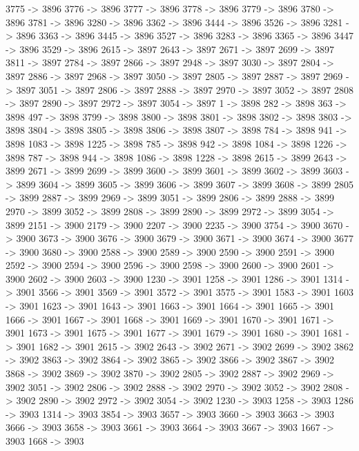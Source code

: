 {	3775 -> 3896
	3776 -> 3896
	3777 -> 3896
	3778 -> 3896
	3779 -> 3896
	3780 -> 3896
	3781 -> 3896
	3280 -> 3896
	3362 -> 3896
	3444 -> 3896
	3526 -> 3896
	3281 -> 3896
	3363 -> 3896
	3445 -> 3896
	3527 -> 3896
	3283 -> 3896
	3365 -> 3896
	3447 -> 3896
	3529 -> 3896
	2615 -> 3897
	2643 -> 3897
	2671 -> 3897
	2699 -> 3897
	3811 -> 3897
	2784 -> 3897
	2866 -> 3897
	2948 -> 3897
	3030 -> 3897
	2804 -> 3897
	2886 -> 3897
	2968 -> 3897
	3050 -> 3897
	2805 -> 3897
	2887 -> 3897
	2969 -> 3897
	3051 -> 3897
	2806 -> 3897
	2888 -> 3897
	2970 -> 3897
	3052 -> 3897
	2808 -> 3897
	2890 -> 3897
	2972 -> 3897
	3054 -> 3897
	1 -> 3898
	282 -> 3898
	363 -> 3898
	497 -> 3898
	3799 -> 3898
	3800 -> 3898
	3801 -> 3898
	3802 -> 3898
	3803 -> 3898
	3804 -> 3898
	3805 -> 3898
	3806 -> 3898
	3807 -> 3898
	784 -> 3898
	941 -> 3898
	1083 -> 3898
	1225 -> 3898
	785 -> 3898
	942 -> 3898
	1084 -> 3898
	1226 -> 3898
	787 -> 3898
	944 -> 3898
	1086 -> 3898
	1228 -> 3898
	2615 -> 3899
	2643 -> 3899
	2671 -> 3899
	2699 -> 3899
	3600 -> 3899
	3601 -> 3899
	3602 -> 3899
	3603 -> 3899
	3604 -> 3899
	3605 -> 3899
	3606 -> 3899
	3607 -> 3899
	3608 -> 3899
	2805 -> 3899
	2887 -> 3899
	2969 -> 3899
	3051 -> 3899
	2806 -> 3899
	2888 -> 3899
	2970 -> 3899
	3052 -> 3899
	2808 -> 3899
	2890 -> 3899
	2972 -> 3899
	3054 -> 3899
	2151 -> 3900
	2179 -> 3900
	2207 -> 3900
	2235 -> 3900
	3754 -> 3900
	3670 -> 3900
	3673 -> 3900
	3676 -> 3900
	3679 -> 3900
	3671 -> 3900
	3674 -> 3900
	3677 -> 3900
	3680 -> 3900
	2588 -> 3900
	2589 -> 3900
	2590 -> 3900
	2591 -> 3900
	2592 -> 3900
	2594 -> 3900
	2596 -> 3900
	2598 -> 3900
	2600 -> 3900
	2601 -> 3900
	2602 -> 3900
	2603 -> 3900
	1230 -> 3901
	1258 -> 3901
	1286 -> 3901
	1314 -> 3901
	3566 -> 3901
	3569 -> 3901
	3572 -> 3901
	3575 -> 3901
	1583 -> 3901
	1603 -> 3901
	1623 -> 3901
	1643 -> 3901
	1663 -> 3901
	1664 -> 3901
	1665 -> 3901
	1666 -> 3901
	1667 -> 3901
	1668 -> 3901
	1669 -> 3901
	1670 -> 3901
	1671 -> 3901
	1673 -> 3901
	1675 -> 3901
	1677 -> 3901
	1679 -> 3901
	1680 -> 3901
	1681 -> 3901
	1682 -> 3901
	2615 -> 3902
	2643 -> 3902
	2671 -> 3902
	2699 -> 3902
	3862 -> 3902
	3863 -> 3902
	3864 -> 3902
	3865 -> 3902
	3866 -> 3902
	3867 -> 3902
	3868 -> 3902
	3869 -> 3902
	3870 -> 3902
	2805 -> 3902
	2887 -> 3902
	2969 -> 3902
	3051 -> 3902
	2806 -> 3902
	2888 -> 3902
	2970 -> 3902
	3052 -> 3902
	2808 -> 3902
	2890 -> 3902
	2972 -> 3902
	3054 -> 3902
	1230 -> 3903
	1258 -> 3903
	1286 -> 3903
	1314 -> 3903
	3854 -> 3903
	3657 -> 3903
	3660 -> 3903
	3663 -> 3903
	3666 -> 3903
	3658 -> 3903
	3661 -> 3903
	3664 -> 3903
	3667 -> 3903
	1667 -> 3903
	1668 -> 3903
}
